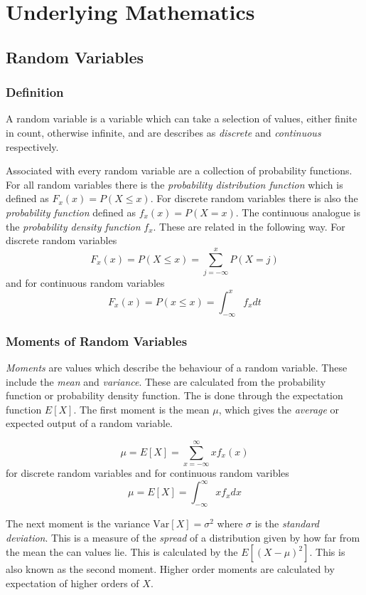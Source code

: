 \appendix

\chapter{Underlying Mathematics}

\section{Random Variables}

\subsection{Definition}

A random variable is a variable which can take a selection of values,
either finite in count, otherwise infinite, and are describes as {\em
discrete} and {\em continuous} respectively.

Associated with every random variable are a collection of probability
functions.  For all random variables there is the {\em probability
distribution function} which is defined as $F_x(x) = P(X \leq x)$.
For discrete random variables there is also the {\em probability
function} defined as $f_x(x) = P(X = x)$.  The continuous analogue is
the {\em probability density function} $f_x$.  These are related in
the following way.  For discrete random variables
\[ F_x(x) = P(X \leq x) = \sum_{j = - \infty}^{x}{P(X = j)} \]
and for continuous random variables
\[ F_x(x) = P(x \leq x) = \int_{ - \infty}^{x}{f_x dt} \]

\subsection{Moments of Random Variables}

{\em Moments} are values which describe the behaviour of a random
variable.  These include the {\em mean} and {\em variance}.  These are
calculated from the probability function or probability density
function.  The is done through the expectation function $E[X]$.  The
first moment is the mean $\mu$, which gives the {\em average} or
expected output of a random variable.

\[ \mu = E[X] = \sum_{x = -\infty}^{\infty}{x f_x(x)} \]
for discrete random variables and for continuous random varibles
\[ \mu = E[X] = \int_{-\infty}^{\infty}{x f_x dx} \]

The next moment is the variance $\mbox{Var}[X] = \sigma^2$ where
$\sigma$ is the {\em standard deviation}.  This is a measure of the
{\em spread} of a distribution given by how far from the mean the
can values lie.  This is calculated by the $E[(X-\mu)^2]$.  This is
also known as the second moment.  Higher order moments are calculated
by expectation of higher orders of $X$.

